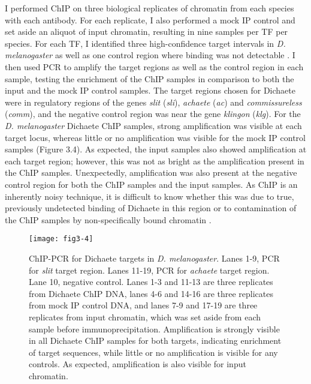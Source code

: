 I performed ChIP on three biological replicates of chromatin from each species with each antibody. For each replicate, I also performed a mock IP control and set aside an aliquot of input chromatin, resulting in nine samples per TF per species. For each TF, I identified three high-confidence target intervals in \emph{D. melanogaster} as well as one control region where binding was not detectable \citep{aleksic_role_2013,ferrero_soxneuro_2014}. I then used PCR to amplify the target regions as well as the control region in each sample, testing the enrichment of the ChIP samples in comparison to both the input and the mock IP control samples. The target regions chosen for Dichaete were in regulatory regions of the genes \emph{slit} (\emph{sli}), \emph{achaete} (\emph{ac}) and \emph{commissureless} (\emph{comm}), and the negative control region was near the gene \emph{klingon} (\emph{klg}). For the \emph{D. melanogaster} Dichaete ChIP samples, strong amplification was visible at each target locus, whereas little or no amplification was visible for the mock IP control samples (Figure 3.4). As expected, the input samples also showed amplification at each target region; however, this was not as bright as the amplification present in the ChIP samples. Unexpectedly, amplification was also present at the negative control region for both the ChIP samples and the input samples. As ChIP is an inherently noisy technique, it is difficult to know whether this was due to true, previously undetected binding of Dichaete in this region or to contamination of the ChIP samples by non-specifically bound chromatin \citep{aleksic_chiping_2009,buck_chip-chip:_2004}.\\

\begin{figure}
\centering
\texttt{[image: fig3-4]}
\caption{ChIP-PCR for Dichaete targets in \emph{D. melanogaster}. Lanes 1-9, PCR for \emph{slit} target region. Lanes 11-19, PCR for \emph{achaete} target region. Lane 10, negative control. Lanes 1-3 and 11-13 are three replicates from Dichaete ChIP DNA, lanes 4-6 and 14-16 are three replicates from mock IP control DNA, and lanes 7-9 and 17-19 are three replicates from input chromatin, which was set aside from each sample before immunoprecipitation. Amplification is strongly visible in all Dichaete ChIP samples for both targets, indicating enrichment of target sequences, while little or no amplification is visible for any controls. As expected, amplification is also visible for input chromatin.}
\label{Figure 3.4}
\end{figure}

